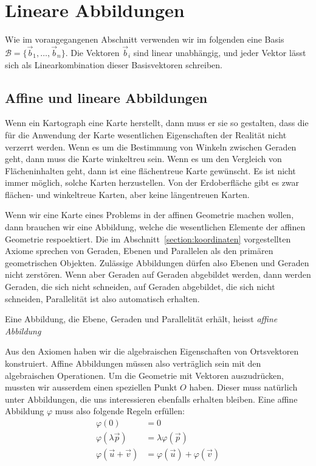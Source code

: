 %
%
%
\section{Lineare Abbildungen%
\label{section:lineare abbildungen}}
Wie im vorangegangenen Abschnitt verwenden wir im folgenden eine Basis
$\mathcal{B}=\{\vec{b}_1,\dots,\vec{b}_n\}$.
Die Vektoren $\vec{b}_i$
sind linear unabhängig, und jeder Vektor lässt sich als Linearkombination
dieser Basisvektoren schreiben.

%
%
\subsection{Affine und lineare Abbildungen}
Wenn ein Kartograph eine Karte herstellt, dann muss er sie so
gestalten, dass die für die Anwendung der Karte wesentlichen
Eigenschaften der Realität nicht verzerrt werden.
Wenn es um die Bestimmung von Winkeln zwischen Geraden geht, dann
muss die Karte winkeltreu sein.
Wenn es um den Vergleich von Flächeninhalten geht, dann ist eine
flächentreue Karte gewünscht.
Es ist nicht immer möglich, solche Karten herzustellen. 
Von der Erdoberfläche gibt es zwar flächen- und winkeltreue Karten,
aber keine längentreuen Karten.

Wenn wir eine Karte eines Problems in der affinen Geometrie machen wollen,
dann brauchen wir eine Abbildung, welche die wesentlichen
Elemente der affinen Geometrie respoektiert.
Die im Abschnitt~\ref{section:koordinaten} vorgestellten Axiome
sprechen von Geraden, Ebenen und Parallelen als den primären geometrischen
Objekten.
Zulässige Abbildungen dürfen also Ebenen und Geraden nicht zerstören.
Wenn aber Geraden auf Geraden abgebildet werden, dann werden Geraden,
die sich nicht schneiden, auf Geraden abgebildet, die sich nicht schneiden,
Parallelität ist also automatisch erhalten.

\begin{definition}
Eine Abbildung, die Ebene, Geraden und Parallelität erhält,
heisst {\em affine Abbildung}
\end{definition}

Aus den Axiomen haben wir die algebraischen Eigenschaften von Ortsvektoren
konstruiert.
Affine Abbildungen müssen also verträglich sein mit den algebraischen
Operationen.
Um die Geometrie mit Vektoren auszudrücken, mussten wir ausserdem
einen speziellen Punkt $O$ haben.
Dieser muss natürlich unter Abbildungen, die uns interessieren
ebenfalls erhalten bleiben.
Eine affine Abbildung $\varphi$ muss also folgende Regeln erfüllen:
\begin{align*}
\varphi(0)&=0
\\
\varphi(\lambda\vec{p})&=\lambda\varphi(\vec{p})
\\
\varphi(\vec{u}+\vec{v})&=\varphi(\vec{u}) + \varphi(\vec{v})
\end{align*}

